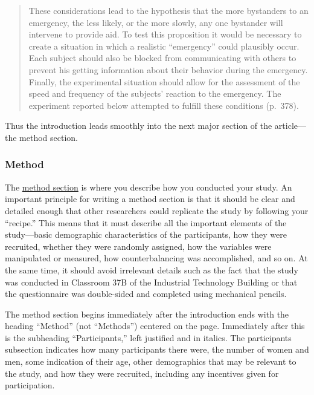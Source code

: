 \documentclass[
]{krantz}
\begin{document}
\begin{quote}
These considerations lead to the hypothesis that the more bystanders to an emergency, the less likely, or the more slowly, any one bystander will intervene to provide aid. To test this proposition it would be necessary to create a situation in which a realistic ``emergency'' could plausibly occur. Each subject should also be blocked from communicating with others to prevent his getting information about their behavior during the emergency. Finally, the experimental situation should allow for the assessment of the speed and frequency of the subjects' reaction to the emergency. The experiment reported below attempted to fulfill these conditions (p.~378).
\end{quote}

Thus the introduction leads smoothly into the next major section of the article---the method section.

\hypertarget{method}{%
\subsubsection*{Method}\label{method}}


The \protect\hyperlink{method-section}{method section} is where you describe how you conducted your study. An important principle for writing a method section is that it should be clear and detailed enough that other researchers could replicate the study by following your ``recipe.'' This means that it must describe all the important elements of the study---basic demographic characteristics of the participants, how they were recruited, whether they were randomly assigned, how the variables were manipulated or measured, how counterbalancing was accomplished, and so on. At the same time, it should avoid irrelevant details such as the fact that the study was conducted in Classroom 37B of the Industrial Technology Building or that the questionnaire was double-sided and completed using mechanical pencils.

The method section begins immediately after the introduction ends with the heading ``Method'' (not ``Methods'') centered on the page. Immediately after this is the subheading ``Participants,'' left justified and in italics. The participants subsection indicates how many participants there were, the number of women and men, some indication of their age, other demographics that may be relevant to the study, and how they were recruited, including any incentives given for participation.
\end{document}
